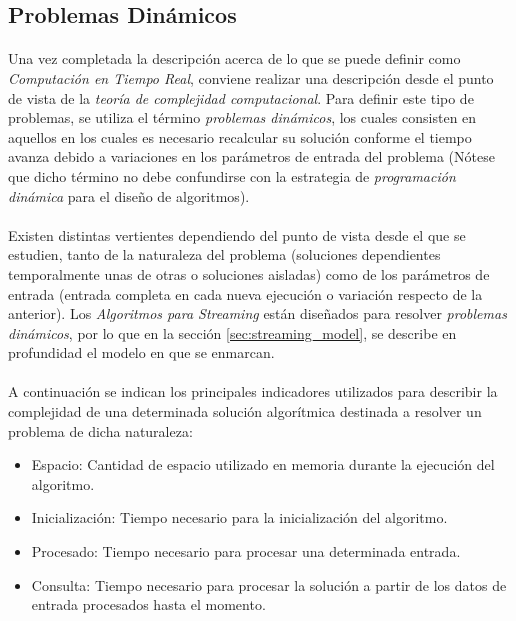 \documentclass{subfiles}
\begin{document}
      \subsection{Problemas Dinámicos}
      \label{sec:dynamic_problems}

        \paragraph{}
        Una vez completada la descripción acerca de lo que se puede definir como \emph{Computación en Tiempo Real}, conviene realizar una descripción desde el punto de vista de la \emph{teoría de complejidad computacional}. Para definir este tipo de problemas, se utiliza el término \emph{problemas dinámicos}, los cuales consisten en aquellos en los cuales es necesario recalcular su solución conforme el tiempo avanza debido a variaciones en los parámetros de entrada del problema (Nótese que dicho término no debe confundirse con la estrategia de \emph{programación dinámica} para el diseño de algoritmos).

        \paragraph{}
        Existen distintas vertientes dependiendo del punto de vista desde el que se estudien, tanto de la naturaleza del problema (soluciones dependientes temporalmente unas de otras o soluciones aisladas) como de los parámetros de entrada (entrada completa en cada nueva ejecución o variación respecto de la anterior). Los \emph{Algoritmos para Streaming} están diseñados para resolver \emph{problemas dinámicos}, por lo que en la sección \ref{sec:streaming_model}, se describe en profundidad el modelo en que se enmarcan.

        \paragraph{}
        A continuación se indican los principales indicadores utilizados para describir la complejidad de una determinada solución algorítmica destinada a resolver un problema de dicha naturaleza:

        \begin{itemize}
          \item Espacio: Cantidad de espacio utilizado en memoria durante la ejecución del algoritmo.
          \item Inicialización: Tiempo necesario para la inicialización del algoritmo.
          \item Procesado: Tiempo necesario para procesar una determinada entrada.
          \item Consulta: Tiempo necesario para procesar la solución a partir de los datos de entrada procesados hasta el momento.
        \end{itemize}
\end{document}
